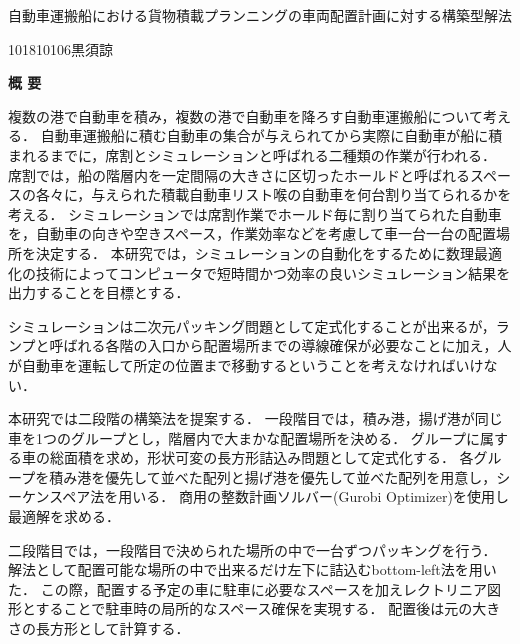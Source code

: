 \begin{center}
{\LARGE 自動車運搬船における貨物積載プランニングの車両配置計画に対する構築型解法}\\[0.5cm]
\end{center}
\hfill
{\large 101810106\qquad 黒須諒}\\[0.5cm]
\begin{center}
{\Large \bf 概 要}\\
\end{center}

複数の港で自動車を積み，複数の港で自動車を降ろす自動車運搬船について考える．
自動車運搬船に積む自動車の集合が与えられてから実際に自動車が船に積まれるまでに，席割とシミュレーションと呼ばれる二種類の作業が行われる．
席割では，船の階層内を一定間隔の大きさに区切ったホールドと呼ばれるスペースの各々に，与えられた積載自動車リスト喉の自動車を何台割り当てられるかを考える．
シミュレーションでは席割作業でホールド毎に割り当てられた自動車を，自動車の向きや空きスペース，作業効率などを考慮して車一台一台の配置場所を決定する．
本研究では，シミュレーションの自動化をするために数理最適化の技術によってコンピュータで短時間かつ効率の良いシミュレーション結果を出力することを目標とする．

シミュレーションは二次元パッキング問題として定式化することが出来るが，ランプと呼ばれる各階の入口から配置場所までの導線確保が必要なことに加え，人が自動車を運転して所定の位置まで移動するということを考えなければいけない．

本研究では二段階の構築法を提案する．
一段階目では，積み港，揚げ港が同じ車を1つのグループとし，階層内で大まかな配置場所を決める．
グループに属する車の総面積を求め，形状可変の長方形詰込み問題として定式化する．
各グループを積み港を優先して並べた配列と揚げ港を優先して並べた配列を用意し，シーケンスペア法を用いる．
商用の整数計画ソルバー(Gurobi Optimizer)を使用し最適解を求める．

二段階目では，一段階目で決められた場所の中で一台ずつパッキングを行う．
解法として配置可能な場所の中で出来るだけ左下に詰込むbottom-left法を用いた．
この際，配置する予定の車に駐車に必要なスペースを加えレクトリニア図形とすることで駐車時の局所的なスペース確保を実現する．
配置後は元の大きさの長方形として計算する．


